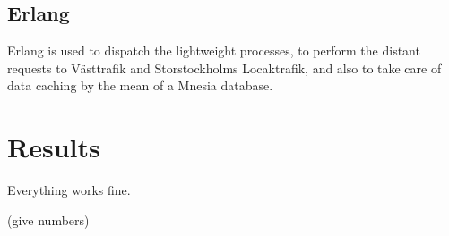 \subsection{Erlang}

Erlang is used to dispatch the lightweight processes, to perform the distant requests to Västtrafik and Storstockholms Locaktrafik, and also to take care of data caching by the mean of a Mnesia database.

\section{Results}

Everything works fine.

(give numbers)